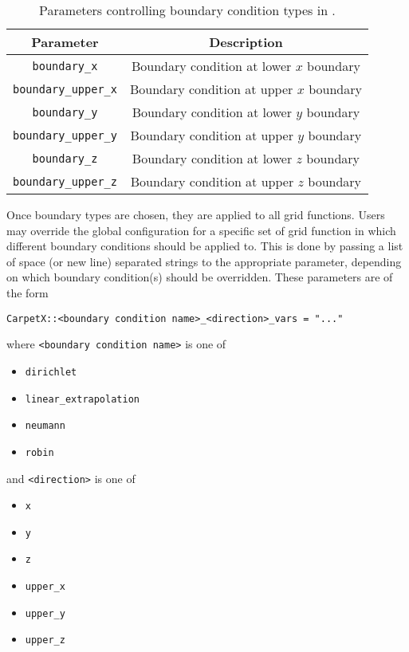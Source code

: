 \begin{table}[ht]
    \centering
    \begin{tabular}{cc}
    Parameter                   & Description                             \\\hline\hline
    \texttt{boundary\_x}        & Boundary condition at lower $x$ boundary\\
    \texttt{boundary\_upper\_x} & Boundary condition at upper $x$ boundary\\
    \texttt{boundary\_y}        & Boundary condition at lower $y$ boundary\\
    \texttt{boundary\_upper\_y} & Boundary condition at upper $y$ boundary\\
    \texttt{boundary\_z}        & Boundary condition at lower $z$ boundary\\
    \texttt{boundary\_upper\_z} & Boundary condition at upper $z$ boundary\\\hline\hline
    \end{tabular}
    \caption{Parameters controlling boundary condition types in \CarpetX.}
    \label{tab:boundary_settings}
\end{table}

  Once boundary types are chosen, they are applied to all grid functions. Users may override the global configuration for a specific set of grid function in which different boundary conditions should be applied to. This is done by passing a list of space (or new line) separated strings to the appropriate parameter, depending on which boundary condition(s) should be overridden. These parameters are of the form
%
  \begin{center}
    \texttt{CarpetX::<boundary condition name>\_<direction>\_vars = "..."}
  \end{center}
%
where \texttt{<boundary condition name>} is one of
%
\begin{itemize}
  \item \texttt{dirichlet}
  \item \texttt{linear\_extrapolation}
  \item \texttt{neumann}
  \item \texttt{robin}
\end{itemize}
%
and \texttt{<direction>} is one of
\begin{itemize}
  \item \texttt{x}
  \item \texttt{y}
  \item \texttt{z}
  \item \texttt{upper\_x}
  \item \texttt{upper\_y}
  \item \texttt{upper\_z}
\end{itemize}

